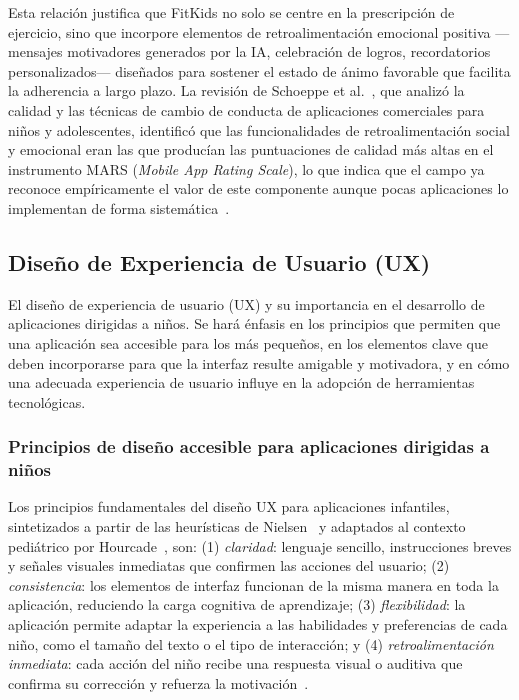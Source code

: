 					Esta relación justifica que FitKids no solo se centre en la prescripción de ejercicio, sino que incorpore elementos de retroalimentación emocional positiva ---mensajes motivadores generados por la IA, celebración de logros, recordatorios personalizados--- diseñados para sostener el estado de ánimo favorable que facilita la adherencia a largo plazo. La revisión de Schoeppe et al.~\cite{Schoeppe2017}, que analizó la calidad y las técnicas de cambio de conducta de aplicaciones comerciales para niños y adolescentes, identificó que las funcionalidades de retroalimentación social y emocional eran las que producían las puntuaciones de calidad más altas en el instrumento MARS (\textit{Mobile App Rating Scale}), lo que indica que el campo ya reconoce empíricamente el valor de este componente aunque pocas aplicaciones lo implementan de forma sistemática~\cite{Schoeppe2017}.

			\subsection{Diseño de Experiencia de Usuario (UX)}
				El diseño de experiencia de usuario (UX) y su importancia en el desarrollo de aplicaciones dirigidas a niños. Se hará énfasis en los principios que permiten que una aplicación sea accesible para los más pequeños, en los elementos clave que deben incorporarse para que la interfaz resulte amigable y motivadora, y en cómo una adecuada experiencia de usuario influye en la adopción de herramientas tecnológicas.


				\subsubsection{Principios de diseño accesible para aplicaciones dirigidas a niños}
					Los principios fundamentales del diseño UX para aplicaciones infantiles, sintetizados a partir de las heurísticas de Nielsen~\cite{Nielsen1994} y adaptados al contexto pediátrico por Hourcade~\cite{Hourcade2015}, son: (1) \textit{claridad}: lenguaje sencillo, instrucciones breves y señales visuales inmediatas que confirmen las acciones del usuario; (2) \textit{consistencia}: los elementos de interfaz funcionan de la misma manera en toda la aplicación, reduciendo la carga cognitiva de aprendizaje; (3) \textit{flexibilidad}: la aplicación permite adaptar la experiencia a las habilidades y preferencias de cada niño, como el tamaño del texto o el tipo de interacción; y (4) \textit{retroalimentación inmediata}: cada acción del niño recibe una respuesta visual o auditiva que confirma su corrección y refuerza la motivación~\cite{Hourcade2015,Nielsen1994}.
					
